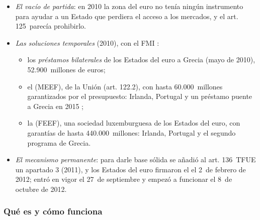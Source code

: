 \documentclass[11pt]{article}
\begin{document}
\begin{itemize}
\item \emph{El vacío de partida}: en 2010 la zona del euro no tenía ningún instrumento para ayudar a un Estado que perdiera el acceso a los mercados, y el art. 125~parecía prohibirlo.
\item \emph{Las soluciones temporales} (2010), con el FMI\nocite{MEDE2026Inversores} :
  \begin{itemize}
  \item los \emph{préstamos bilaterales} de los Estados del euro a Grecia (mayo de 2010), 52.900~millones de euros;
  \item el  (MEEF), de la Unión (art. 122.2), con hasta 60.000~millones garantizados por el presupuesto: Irlanda, Portugal y un préstamo puente a Grecia en 2015 ;
  \item la  (FEEF), una sociedad luxemburguesa de los Estados del euro, con garantías de hasta 440.000~millones: Irlanda, Portugal y el segundo programa de Grecia.
  \end{itemize}
\item \emph{El mecanismo permanente}: para darle base sólida se añadió al art. 136~TFUE un apartado 3 (2011), y los Estados del euro firmaron el  el 2~de febrero de 2012; entró en vigor el 27~de septiembre y empezó a funcionar el 8~de octubre de 2012\nocite{MEDE2012Tratado}.
\end{itemize}

\subsubsection{Qué es y cómo funciona}\label{sec:mede-funcion}
\end{document}
